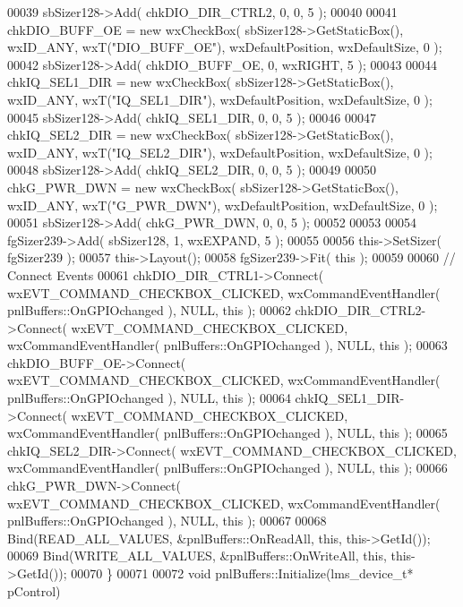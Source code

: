 \begin{DoxyCode}
00039     sbSizer128->Add( chkDIO\_DIR\_CTRL2, 0, 0, 5 );
00040 
00041     chkDIO\_BUFF\_OE = \textcolor{keyword}{new} wxCheckBox( sbSizer128->GetStaticBox(), wxID\_ANY, wxT(\textcolor{stringliteral}{"DIO\_BUFF\_OE"}), 
      wxDefaultPosition, wxDefaultSize, 0 );
00042     sbSizer128->Add( chkDIO\_BUFF\_OE, 0, wxRIGHT, 5 );
00043 
00044     chkIQ\_SEL1\_DIR = \textcolor{keyword}{new} wxCheckBox( sbSizer128->GetStaticBox(), wxID\_ANY, wxT(\textcolor{stringliteral}{"IQ\_SEL1\_DIR"}), 
      wxDefaultPosition, wxDefaultSize, 0 );
00045     sbSizer128->Add( chkIQ\_SEL1\_DIR, 0, 0, 5 );
00046 
00047     chkIQ\_SEL2\_DIR = \textcolor{keyword}{new} wxCheckBox( sbSizer128->GetStaticBox(), wxID\_ANY, wxT(\textcolor{stringliteral}{"IQ\_SEL2\_DIR"}), 
      wxDefaultPosition, wxDefaultSize, 0 );
00048     sbSizer128->Add( chkIQ\_SEL2\_DIR, 0, 0, 5 );
00049 
00050     chkG\_PWR\_DWN = \textcolor{keyword}{new} wxCheckBox( sbSizer128->GetStaticBox(), wxID\_ANY, wxT(\textcolor{stringliteral}{"G\_PWR\_DWN"}), 
      wxDefaultPosition, wxDefaultSize, 0 );
00051     sbSizer128->Add( chkG\_PWR\_DWN, 0, 0, 5 );
00052 
00053 
00054     fgSizer239->Add( sbSizer128, 1, wxEXPAND, 5 );
00055 
00056     this->SetSizer( fgSizer239 );
00057     this->Layout();
00058     fgSizer239->Fit( \textcolor{keyword}{this} );
00059 
00060     \textcolor{comment}{// Connect Events}
00061     chkDIO\_DIR\_CTRL1->Connect( wxEVT\_COMMAND\_CHECKBOX\_CLICKED, wxCommandEventHandler( 
      pnlBuffers::OnGPIOchanged ), NULL, \textcolor{keyword}{this} );
00062     chkDIO\_DIR\_CTRL2->Connect( wxEVT\_COMMAND\_CHECKBOX\_CLICKED, wxCommandEventHandler( 
      pnlBuffers::OnGPIOchanged ), NULL, \textcolor{keyword}{this} );
00063     chkDIO\_BUFF\_OE->Connect( wxEVT\_COMMAND\_CHECKBOX\_CLICKED, wxCommandEventHandler( 
      pnlBuffers::OnGPIOchanged ), NULL, \textcolor{keyword}{this} );
00064     chkIQ\_SEL1\_DIR->Connect( wxEVT\_COMMAND\_CHECKBOX\_CLICKED, wxCommandEventHandler( 
      pnlBuffers::OnGPIOchanged ), NULL, \textcolor{keyword}{this} );
00065     chkIQ\_SEL2\_DIR->Connect( wxEVT\_COMMAND\_CHECKBOX\_CLICKED, wxCommandEventHandler( 
      pnlBuffers::OnGPIOchanged ), NULL, \textcolor{keyword}{this} );
00066     chkG\_PWR\_DWN->Connect( wxEVT\_COMMAND\_CHECKBOX\_CLICKED, wxCommandEventHandler( 
      pnlBuffers::OnGPIOchanged ), NULL, \textcolor{keyword}{this} );
00067 
00068     Bind(READ\_ALL\_VALUES, &pnlBuffers::OnReadAll, \textcolor{keyword}{this}, this->GetId());
00069     Bind(WRITE\_ALL\_VALUES, &pnlBuffers::OnWriteAll, \textcolor{keyword}{this}, this->GetId());
00070 \}
00071 
00072 \textcolor{keywordtype}{void} pnlBuffers::Initialize(lms_device_t* pControl)

\end{DoxyCode}

